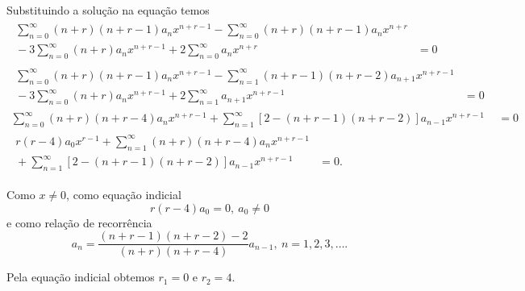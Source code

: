 \documentclass[a4paper,12pt, leqno, answers]{exam}
\begin{document}
\begin{questions}
\begin{solution}
        Substituindo a solu\c{c}\~{a}o na equa\c{c}\~{a}o temos
        \begin{align*}
            \begin{split}
                \sum_{n = 0}^\infty \left( n + r \right) \left( n + r - 1 \right) a_n x^{n + r - 1} - \sum_{n = 0}^\infty \left( n + r \right) \left( n + r - 1 \right) a_n x^{n + r} \\  {}- 3 \sum_{n = 0}^\infty \left( n + r \right) a_n x^{n + r - 1} + 2 \sum_{n = 0}^\infty a_n x^{n + r} &= 0
            \end{split} \\
            \begin{split}
                \sum_{n = 0}^\infty \left( n + r \right) \left( n + r - 1 \right) a_n x^{n + r - 1} - \sum_{n = 1}^\infty \left( n + r - 1 \right) \left( n + r - 2 \right) a_{n + 1} x^{n + r - 1} \\  {}- 3 \sum_{n = 0}^\infty \left( n + r \right) a_n x^{n + r - 1} + 2 \sum_{n = 1}^\infty a_{n + 1} x^{n + r - 1} &= 0
            \end{split} \\
            \sum_{n = 0}^\infty \left( n + r \right) \left( n + r - 4 \right) a_n x^{n + r - 1} + \sum_{n = 1}^\infty \left[ 2 - \left( n + r - 1 \right) \left( n + r - 2 \right) \right] a_{n - 1} x^{n + r - 1} &= 0 \\
            \begin{split}
                r \left( r - 4 \right) a_0 x^{r - 1} + \sum_{n = 1}^\infty \left( n + r \right) \left( n + r - 4 \right) a_n x^{n + r - 1} \\ {}+ \sum_{n = 1}^\infty \left[ 2 - \left( n + r - 1 \right) \left( n + r - 2 \right) \right] a_{n - 1} x^{n + r - 1} &= 0.
            \end{split}
        \end{align*}

        Como $x \neq 0$, como equa\c{c}\~{a}o indicial
        \[
        r \left( r - 4 \right) a_0 = 0, \ a_0 \neq 0
        \]
        e como rela\c{c}\~{a}o de recorr\^{e}ncia
        \[
        a_n = \frac{\left( n + r - 1 \right) \left( n + r - 2 \right) - 2}{\left( n + r \right) \left( n + r - 4 \right)} a_{n - 1}, \ n = 1, 2, 3, \ldots.
        \]

        Pela equa\c{c}\~{a}o indicial obtemos $r_1 = 0$ e $r_2 = 4$.


\end{solution}
\end{questions}
\end{document}
